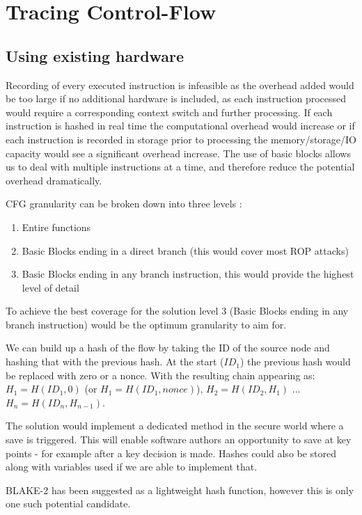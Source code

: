 \section{Tracing Control-Flow}

\subsection{Using existing hardware}

Recording of every executed instruction is infeasible as the overhead added would be too large if no additional hardware is included, as each instruction processed would require a corresponding context switch and further processing. If each instruction is hashed in real time the computational overhead would increase or if each instruction is recorded in storage prior to processing the memory\slash storage\slash IO capacity would see a significant overhead increase. The use of basic blocks allows us to deal with multiple instructions at a time, and therefore reduce the potential overhead dramatically.

CFG granularity can be broken down into three levels \cite{Abera2016}:
\begin{enumerate}
	\item{Entire functions}
	\item{Basic Blocks ending in a direct branch (this would cover most ROP attacks)}
	\item{Basic Blocks ending in any branch instruction, this would provide the highest level of detail}
\end{enumerate}

To achieve the best coverage for the solution level 3 (Basic Blocks ending in any branch instruction) would be the optimum granularity to aim for.

We can build up a hash of the flow by taking the ID of the source node and hashing that with the previous hash. At the start ($ID_1$) the previous hash would be replaced with zero or a nonce. With the resulting chain appearing as: 
$H_1 = H(ID_1,0)$ (or $H_1 = H(ID_1,nonce)$), $H_2 = H(ID_2,H_1)$ ... $H_n = H(ID_n,H_{n-1})$.

The solution would implement a dedicated method in the secure world where a save is triggered. This will enable software authors an opportunity to save at key points - for example after a key decision is made. Hashes could also be stored along with variables used if we are able to implement that.

BLAKE-2 \cite{Aumasson2013} has been suggested as a lightweight hash function, however this is only one such potential candidate.

